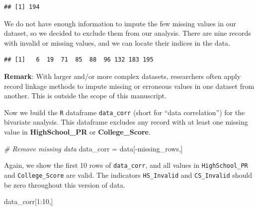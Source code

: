 \documentclass[
]{article}
\newenvironment{Shaded}{\begin{snugshade}}{\end{snugshade}}
\newcommand{\CommentTok}[1]{\textcolor[rgb]{0.56,0.35,0.01}{\textit{#1}}}
\newcommand{\DecValTok}[1]{\textcolor[rgb]{0.00,0.00,0.81}{#1}}
\newcommand{\FunctionTok}[1]{\textcolor[rgb]{0.00,0.00,0.00}{#1}}
\newcommand{\NormalTok}[1]{#1}
\newcommand{\OtherTok}[1]{\textcolor[rgb]{0.56,0.35,0.01}{#1}}
\newcommand{\SpecialCharTok}[1]{\textcolor[rgb]{0.00,0.00,0.00}{#1}}
\begin{document}
\begin{verbatim}
## [1] 194
\end{verbatim}

We do not have enough information to impute the few missing values in
our dataset, so we decided to exclude them from our analysis. There are
nine records with invalid or missing values, and we can locate their
indices in the data.

\begin{Shaded}
\end{Shaded}

\begin{verbatim}
## [1]   6  19  71  85  88  96 132 183 195
\end{verbatim}

\textbf{Remark}: With larger and/or more complex datasets, researchers
often apply record linkage methods \citep{dusetzina2014overview} to
impute missing or erroneous values in one dataset from another. This is
outside the scope of this manuscript.

Now we build the \texttt{R} dataframe \texttt{data\_corr} (short for
``data correlation'') for the bivariate analysis. This dataframe
excludes any record with at least one missing value in
\textbf{HighSchool\_PR} or \textbf{College\_Score}.

\begin{Shaded}
\begin{Highlighting}[]
\CommentTok{\# Remove missing data}
\NormalTok{data\_corr }\OtherTok{=}\NormalTok{ data[}\SpecialCharTok{{-}}\NormalTok{missing\_rows,]}
\end{Highlighting}
\end{Shaded}

Again, we show the first 10 rows of \texttt{data\_corr}, and all values
in \texttt{HighSchool\_PR} and \texttt{College\_Score} are valid. The
indicators \texttt{HS\_Invalid} and \texttt{CS\_Invalid} should be zero
throughout this version of data.

\begin{Shaded}
\begin{Highlighting}[]
\NormalTok{data\_corr[}\DecValTok{1}\SpecialCharTok{:}\DecValTok{10}\NormalTok{,]}
\end{Highlighting}
\end{Shaded}
\end{document}
